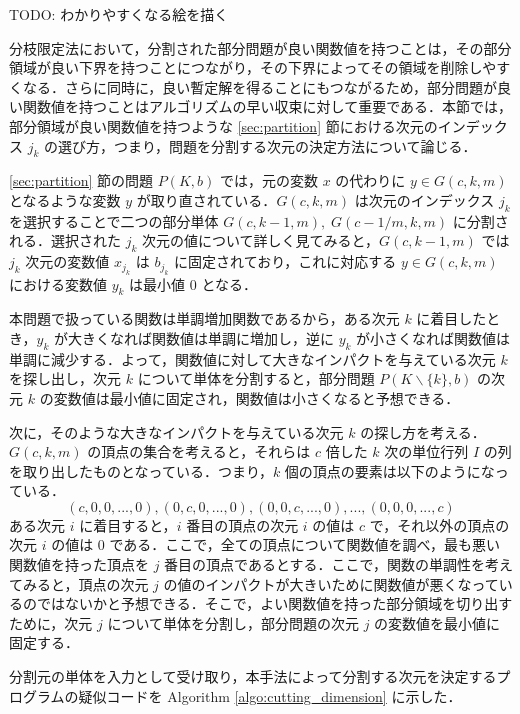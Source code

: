 \documentclass[a4paper,11pt]{jreport}
\begin{document}
TODO: わかりやすくなる絵を描く\par
分枝限定法において，分割された部分問題が良い関数値を持つことは，その部分領域が良い下界を持つことにつながり，その下界によってその領域を削除しやすくなる．さらに同時に，良い暫定解を得ることにもつながるため，部分問題が良い関数値を持つことはアルゴリズムの早い収束に対して重要である．本節では，部分領域が良い関数値を持つような \ref{sec:partition} 節における次元のインデックス $ j_k $ の選び方，つまり，問題を分割する次元の決定方法について論じる．\par
\ref{sec:partition} 節の問題 $ P(K, b) $ では，元の変数 $ x $ の代わりに $ y \in G(c, k, m) $ となるような変数 $ y $ が取り直されている．$ G(c, k, m) $ は次元のインデックス $ j_k $ を選択することで二つの部分単体 $ G(c, k-1, m), \; G(c-1/m, k, m) $ に分割される．選択された $ j_k $ 次元の値について詳しく見てみると，$ G(c, k - 1, m) $ では $ j_k $ 次元の変数値 $ x_{j_k} $ は $ b_{j_k} $ に固定されており，これに対応する $ y \in G(c, k, m) $ における変数値 $ y_k $ は最小値 $ 0 $ となる．\par
本問題で扱っている関数は単調増加関数であるから，ある次元 $ k $ に着目したとき，$ y_k $ が大きくなれば関数値は単調に増加し，逆に $ y_k $ が小さくなれば関数値は単調に減少する．よって，関数値に対して大きなインパクトを与えている次元 $ k $ を探し出し，次元 $ k $ について単体を分割すると，部分問題 $ P(K \backslash \{ k \}, b) $ の次元 $ k $ の変数値は最小値に固定され，関数値は小さくなると予想できる．\par
次に，そのような大きなインパクトを与えている次元 $ k $ の探し方を考える．$ G(c, k, m) $ の頂点の集合を考えると，それらは $ c $ 倍した $ k $ 次の単位行列 $ I $ の列を取り出したものとなっている．つまり，$ k $ 個の頂点の要素は以下のようになっている．
$$ (c, 0, 0, ..., 0), (0, c, 0, ..., 0), (0, 0, c, ..., 0), ..., (0, 0, 0, ..., c) $$
ある次元 $ i $ に着目すると，$ i $ 番目の頂点の次元 $ i $ の値は $ c $ で，それ以外の頂点の次元 $ i $ の値は $ 0 $ である．ここで，全ての頂点について関数値を調べ，最も悪い関数値を持った頂点を $ j $ 番目の頂点であるとする．ここで，関数の単調性を考えてみると，頂点の次元 $ j $ の値のインパクトが大きいために関数値が悪くなっているのではないかと予想できる．そこで，よい関数値を持った部分領域を切り出すために，次元 $ j $ について単体を分割し，部分問題の次元 $ j $ の変数値を最小値に固定する．\par
分割元の単体を入力として受け取り，本手法によって分割する次元を決定するプログラムの疑似コードを Algorithm \ref{algo:cutting_dimension} に示した．\par
\end{document}
